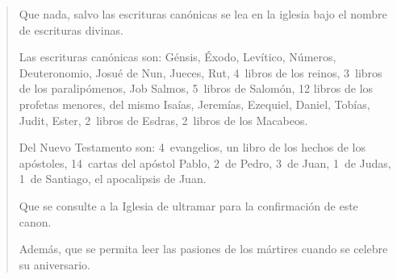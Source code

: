 \begin{quotation}
Que nada, salvo las escrituras canónicas se lea en la iglesia bajo el nombre de escrituras divinas.

Las escrituras canónicas son: Génsis, Éxodo, Levítico, Números, Deuteronomio, Josué de Nun, Jueces, Rut, 4~libros de los reinos, 3~libros de los paralipómenos, Job
 Salmos, 5~libros de Salomón, 12 libros de los profetas menores, del mismo Isaías, Jeremías, Ezequiel, Daniel, Tobías, Judit, Ester, 2~libros de Esdras, 2~libros de los Macabeos.

Del Nuevo Testamento son:
4~evangelios, un libro de los hechos de los apóstoles, 14~cartas del apóstol Pablo, 2~de Pedro, 3~de Juan, 1~de Judas, 1~de Santiago, el apocalipsis de Juan.

Que se consulte a la Iglesia de ultramar para la confirmación de este canon.

Además, que se permita leer las pasiones de los mártires cuando se celebre su aniversario.
\end{quotation}
